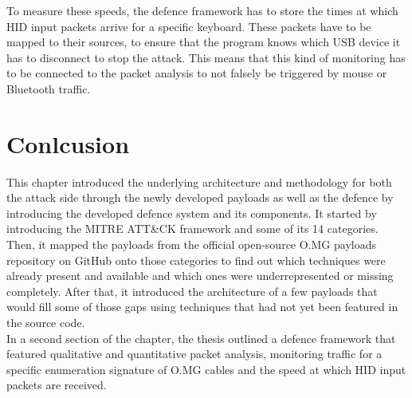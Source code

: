 To measure these speeds, the defence framework has to store the times at which HID input packets arrive for a specific keyboard. These packets have to be mapped to their sources, to ensure that the program knows which USB device it has to disconnect to stop the attack. This means that this kind of monitoring has to be connected to the packet analysis to not falsely be triggered by mouse or Bluetooth traffic. 



\section{Conlcusion}

This chapter introduced the underlying architecture and methodology for both the attack side through the newly developed payloads as well as the defence by introducing the developed defence system and its components. 
It started by introducing the MITRE ATT\&CK framework and some of its 14 categories. Then, it mapped the payloads from the official open-source O.MG payloads repository on GitHub onto those categories to find out which techniques were already present and available and which ones were underrepresented or missing completely. After that, it introduced the architecture of a few payloads that would fill some of those gaps using techniques that had not yet been featured in the source code. \\
In a second section of the chapter, the thesis outlined a defence framework that featured qualitative and quantitative packet analysis, monitoring traffic for a specific enumeration signature of O.MG cables and the speed at which HID input packets are received.



